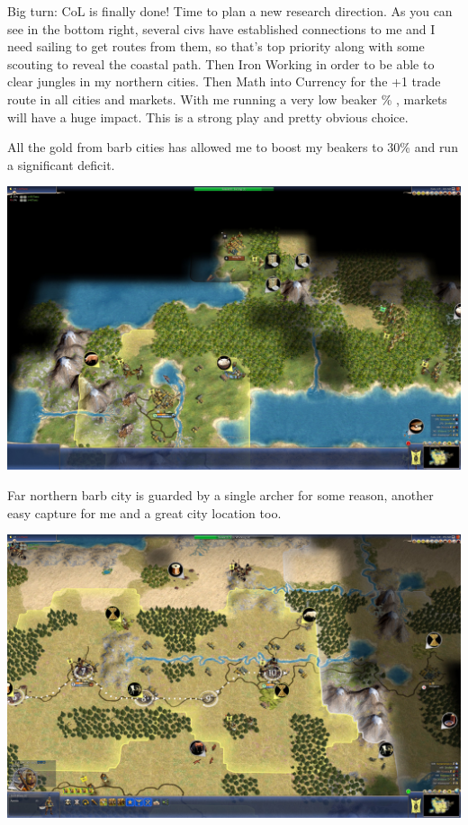 \documentclass[10pt]{article}
\begin{document}
Big turn: CoL is finally done! Time to plan a new research
direction. As you can see in the bottom right, several civs have
established connections to me and I need sailing to get routes from
them, so that's top priority along with some scouting to reveal the
coastal path. Then Iron Working in order to be able to clear jungles
in my northern cities. Then Math into Currency for the +1 trade route
in all cities and markets. With me running a very low beaker \% ,
markets will have a huge impact. This is a strong play and pretty
obvious choice.

All the gold from barb cities has allowed me to boost my beakers to
30\% and run a significant deficit.

\includegraphics[width=1.0\textwidth]{102}

Far northern barb city is guarded by a single archer for some reason, another easy capture
for me and a great city location too.

\includegraphics[width=1.0\textwidth]{103}
\end{document}
